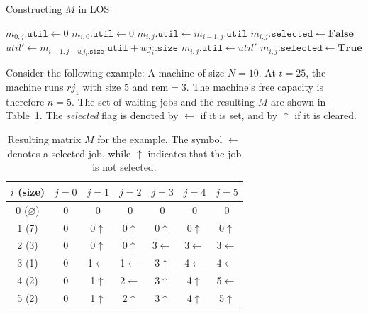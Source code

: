\documentclass[12pt]{book}
\begin{document}
\begin{algorithm}[H]
\caption{Constructing $M$ in LOS}
\label{alg:conM}
\begin{algorithmic}[1]
    \State $m_{0,j}.\texttt{util} \gets 0$ 
\EndFor
{} 
    \State $m_{i,0}.\texttt{util} \gets 0$ 
     
        \State $m_{i,j}.\texttt{util} \gets m_{i-1,j}.\texttt{util}$ 
        \State $m_{i,j}.\texttt{selected} \gets \textbf{False}$
         
            \State $util' \gets m_{i-1, j - wj_i.\texttt{size}}.\texttt{util} + wj_i.\texttt{size}$
             
                \State $m_{i,j}.\texttt{util} \gets util'$
                \State $m_{i,j}.\texttt{selected} \gets \textbf{True}$
            \EndIf
        \EndIf
    \EndFor
\EndFor
\end{algorithmic}
\end{algorithm}

Consider the following example:  
A machine of size $N=10$. At $t=25$, the machine runs $rj_1$ with size $5$ and $\text{rem}=3$. The machine's free capacity is therefore $n=5$. The set of waiting jobs and the resulting $M$ are shown in Table~\ref{tab:MatrixM}. The \emph{selected} flag is denoted by $\leftarrow$ if it is set, and by $\uparrow$ if it is cleared. 

\begin{table}[H]
    \centering
    \renewcommand{\arraystretch}{1.2} %
    \begin{tabular}{|c|c|c|c|c|c|c|}
         \hline
         $i$ (size) & $j=0$ & $j=1$ & $j=2$ & $j=3$ & $j=4$ & $j=5$ \\
         \hline
         0 ($\varnothing$) & 0 & 0 & 0 & 0 & 0 & 0 \\
         1 (7) & 0 & 0$\uparrow$ & 0$\uparrow$ & 0$\uparrow$ & 0$\uparrow$ & 0$\uparrow$ \\
         2 (3) & 0 & 0$\uparrow$ & 0$\uparrow$ & 3$\leftarrow$ & 3$\leftarrow$ & 3$\leftarrow$ \\
         3 (1) & 0 & 1$\leftarrow$ & 1$\leftarrow$ & 3$\uparrow$ & 4$\leftarrow$ & 4$\leftarrow$ \\
         4 (2) & 0 & 1$\uparrow$ & 2$\leftarrow$ & 3$\uparrow$ & 4$\uparrow$ & 5$\leftarrow$ \\
         5 (2) & 0 & 1$\uparrow$ & 2$\uparrow$ & 3$\uparrow$ & 4$\uparrow$ & 5$\uparrow$ \\
         \hline
    \end{tabular}
    \caption{Resulting matrix $M$ for the example. 
    The symbol $\leftarrow$ denotes a selected job, 
    while $\uparrow$ indicates that the job is not selected.}
    \label{tab:MatrixM}
\end{table}
\end{document}
